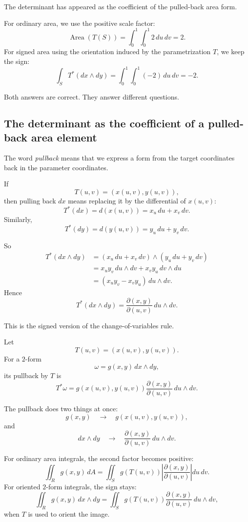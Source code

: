 The determinant has appeared as the coefficient of the pulled-back area form.

For ordinary area, we use the positive scale factor:
\[
    \operatorname{Area}(T(S))
    =
    \int_0^1\int_0^1 2\,du\,dv
    =
    2.
\]
For signed area using the orientation induced by the parametrization \(T\), we keep
the sign:
\[
    \int_S T^*(dx\wedge dy)
    =
    \int_0^1\int_0^1 (-2)\,du\,dv
    =
    -2.
\]

Both answers are correct.  They answer different questions.

\subsection{The determinant as the coefficient of a pulled-back area element}

The word \emph{pullback} means that we express a form from the target coordinates
back in the parameter coordinates.

If
\[
    T(u,v)=(x(u,v),y(u,v)),
\]
then pulling back \(dx\) means replacing it by the differential of \(x(u,v)\):
\[
    T^*(dx)=d(x(u,v))=x_u\,du+x_v\,dv.
\]
Similarly,
\[
    T^*(dy)=d(y(u,v))=y_u\,du+y_v\,dv.
\]

So
\[
\begin{aligned}
T^*(dx\wedge dy)
&=
(x_u\,du+x_v\,dv)\wedge(y_u\,du+y_v\,dv)\\
&=
x_u y_v\,du\wedge dv+x_v y_u\,dv\wedge du\\
&=
(x_u y_v-x_v y_u)\,du\wedge dv.
\end{aligned}
\]
Hence
\[
\boxed{
    T^*(dx\wedge dy)
    =
    \frac{\partial(x,y)}{\partial(u,v)}\,du\wedge dv.
}
\]

This is the signed version of the change-of-variables rule.

\begin{definition}
Let
\[
    T(u,v)=(x(u,v),y(u,v)).
\]
For a \(2\)-form
\[
    \omega=g(x,y)\,dx\wedge dy,
\]
its pullback by \(T\) is
\[
\boxed{
    T^*\omega
    =
    g(x(u,v),y(u,v))
    \frac{\partial(x,y)}{\partial(u,v)}
    \,du\wedge dv.
}
\]
\end{definition}

The pullback does two things at once:
\[
    g(x,y)\quad\longrightarrow\quad g(x(u,v),y(u,v)),
\]
and
\[
    dx\wedge dy\quad\longrightarrow\quad
    \frac{\partial(x,y)}{\partial(u,v)}\,du\wedge dv.
\]

For ordinary area integrals, the second factor becomes positive:
\[
\boxed{
    \iint_R g(x,y)\,dA
    =
    \iint_S g(T(u,v))
    \left|
    \frac{\partial(x,y)}{\partial(u,v)}
    \right|
    du\,dv.
}
\]
For oriented \(2\)-form integrals, the sign stays:
\[
\boxed{
    \iint_R g(x,y)\,dx\wedge dy
    =
    \iint_S
    g(T(u,v))
    \frac{\partial(x,y)}{\partial(u,v)}
    \,du\wedge dv,
}
\]
when \(T\) is used to orient the image.

